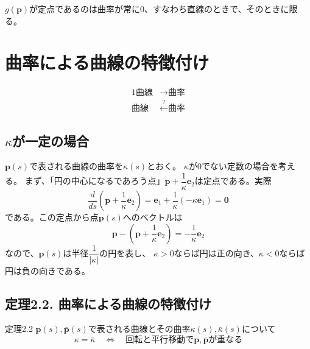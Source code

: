 \documentclass[a4j,disablejfam,dvipdfmx,papersize,slide,uplatex,21pt]{jsarticle}
\begin{document}
$g(\bm{p})$が定点であるのは曲率が常に$0$、すなわち直線のときで、そのときに限る。



\section{曲率による曲線の特徴付け}
\begin{alignat}{1}
    \text{曲線} &\rightarrow \text{曲率} \nonumber \\
    \text{曲線} &\xleftarrow{?} \text{曲率} \nonumber
\end{alignat}

\newpage
\subsection*{$\kappa$が一定の場合}
$\bm{p}(s)$で表される曲線の曲率を$\kappa(s)$とおく。
$\kappa$が$0$でない定数の場合を考える。
まず、「円の中心になるであろう点」$\bm{p} + \dfrac{1}{\kappa} \bm{e}_2$は定点である。実際
\begin{equation}
    \frac{d}{ds} \left( \bm{p} + \dfrac{1}{\kappa} \bm{e}_2 \right)
    = \bm{e}_1 + \frac{1}{\kappa} (- \kappa \bm{e}_1)
    = \bm{0}
\end{equation}
である。この定点から点$\bm{p}(s)$へのベクトルは
\begin{equation}
    \bm{p} - \left( \bm{p} + \dfrac{1}{\kappa} \bm{e}_2 \right)
    = - \frac{1}{\kappa} \bm{e}_2
\end{equation}
なので、$\bm{p}(s)$は半径$\dfrac{1}{|\kappa|}$の円を表し、
$\kappa > 0$ならば円は正の向き、$\kappa < 0$ならば円は負の向きである。

\newpage
\subsection*{定理2.2. 曲率による曲線の特徴付け}
\begin{itembox}[l]{定理2.2}
    $\bm{p}(s), \bar{\bm{p}}(s)$で表される曲線とその曲率$\kappa(s), \bar{\kappa}(s)$について
    \begin{equation}
        \kappa = \bar{\kappa}
        \quad \Longleftrightarrow \quad
        \text{回転と平行移動で$\bm{p}, \bar{\bm{p}}$が重なる}
    \end{equation}
\end{itembox}
\end{document}
